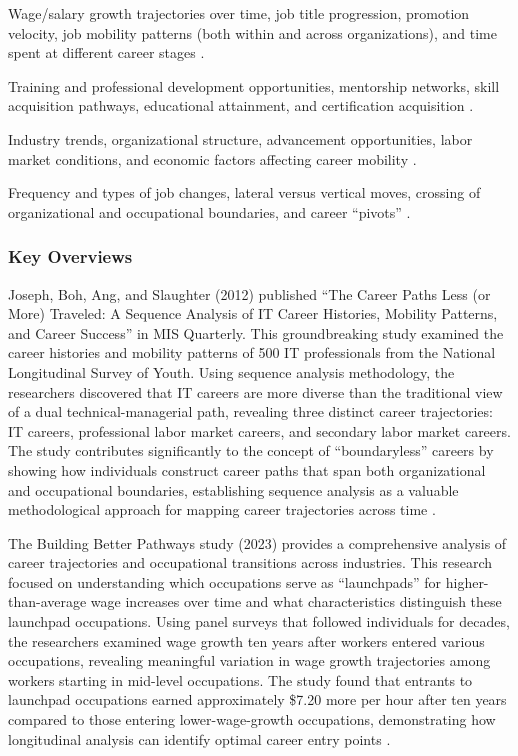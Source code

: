 \documentclass[../main.tex]{subfiles}
\begin{document}
Wage/salary growth trajectories over time, job title progression, promotion velocity, job mobility patterns (both within and across organizations), and time spent at different career stages \parencite{workforcegps2023}.

Training and professional development opportunities, mentorship networks, skill acquisition pathways, educational attainment, and certification acquisition \parencite{collegerecruiter2025,ncsu2023}.

Industry trends, organizational structure, advancement opportunities, labor market conditions, and economic factors affecting career mobility \parencite{chronus2023}.

Frequency and types of job changes, lateral versus vertical moves, crossing of organizational and occupational boundaries, and career ``pivots'' \parencite{joseph2012}.

\subsubsection{Key Overviews}
Joseph, Boh, Ang, and Slaughter (2012) published ``The Career Paths Less (or More) Traveled: A Sequence Analysis of IT Career Histories, Mobility Patterns, and Career Success'' in MIS Quarterly. This groundbreaking study examined the career histories and mobility patterns of 500 IT professionals from the National Longitudinal Survey of Youth. Using sequence analysis methodology, the researchers discovered that IT careers are more diverse than the traditional view of a dual technical-managerial path, revealing three distinct career trajectories: IT careers, professional labor market careers, and secondary labor market careers. The study contributes significantly to the concept of ``boundaryless'' careers by showing how individuals construct career paths that span both organizational and occupational boundaries, establishing sequence analysis as a valuable methodological approach for mapping career trajectories across time \parencite{joseph2012}.

The Building Better Pathways study (2023) provides a comprehensive analysis of career trajectories and occupational transitions across industries. This research focused on understanding which occupations serve as ``launchpads'' for higher-than-average wage increases over time and what characteristics distinguish these launchpad occupations. Using panel surveys that followed individuals for decades, the researchers examined wage growth ten years after workers entered various occupations, revealing meaningful variation in wage growth trajectories among workers starting in mid-level occupations. The study found that entrants to launchpad occupations earned approximately \$7.20 more per hour after ten years compared to those entering lower-wage-growth occupations, demonstrating how longitudinal analysis can identify optimal career entry points \parencite{workforcegps2023}.
\end{document}
